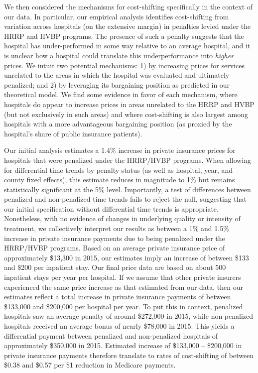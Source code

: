 \documentclass[12pt]{article}
\begin{document}
We then considered the mechanisms for cost-shifting specifically in the context of our data. In particular, our empirical analysis identifies cost-shifting from variation across hospitals (on the extensive margin) in penalties levied under the HRRP and HVBP programs. The presence of such a penalty suggests that the hospital has under-performed in some way relative to an average hospital, and it is unclear how a hospital could translate this underperformance into \textit{higher} prices. We intuit two potential mechanisms: 1) by increasing prices for services unrelated to the areas in which the hospital was evaluated and ultimately penalized; and 2) by leveraging its bargaining position as predicted in our theoretical model. We find some evidence in favor of each mechanism, where hospitals do appear to increase prices in areas unrelated to the HRRP and HVBP (but not exclusively in such areas) and where cost-shifting is also largest among hospitals with a more advantageous bargaining position (as proxied by the hospital's share of public insurance patients).

Our initial analysis estimates a 1.4\% increase in private insurance prices for hospitals that were penalized under the HRRP/HVBP programs. When allowing for differential time trends by penalty status (as well as hospital, year, and county fixed effects), this estimate reduces in magnitude to 1\% but remains statistically significant at the 5\% level. Importantly, a test of differences between penalized and non-penalized time trends fails to reject the null, suggesting that our initial specification without differential time trends is appropriate. Nonetheless, with no evidence of changes in underlying quality or intensity of treatment, we collectively interpret our results as between a 1\% and 1.5\% increase in private insurance payments due to being penalized under the HRRP/HVBP programs. Based on an average private insurance price of approximately \$13,300 in 2015, our estimates imply an increase of between \$133 and \$200 per inpatient stay. Our final price data are based on about 500 inpatient stays per year per hospital. If we assume that other private insurers experienced the same price increase as that estimated from our data, then our estimates reflect a total increase in private insurance payments of between \$133,000 and \$200,000 per hospital per year. To put this in context, penalized hospitals saw an average penalty of around \$272,000 in 2015, while non-penalized hospitals received an average bonus of nearly \$78,000 in 2015. This yields a differential payment between penalized and non-penalized hospitals of approximately \$350,000 in 2015. Estimated increase of \$133,000 -- \$200,000 in private insurance payments therefore translate to rates of cost-shifting of between \$0.38 and \$0.57 per \$1 reduction in Medicare payments.
\end{document}
